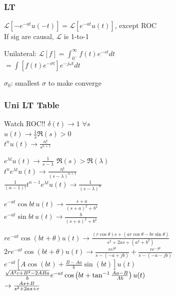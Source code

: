 \documentclass[4pt]{article}
\theoremstyle{definition}
\theoremstyle{definition}
\renewcommand{\o}{\omega}
\newcommand{\ra}{\rightarrow}
\newcommand{\ulint}{\int_{0^-}^{\infty}}    %
\begin{document}
\begin{landscape}
\begin{multicols}{3}
\subsubsection*{LT}
\(\mathcal L [-e^{-at}u(-t)] = \mathcal L [e^{-at} u(t)]\), except ROC\\
If sig are causal, $\mathcal L$ is 1-to-1           %

Unilateral: \(\mathcal{L}[f] = \ulint f(t) e^{-st} dt\)\\          %
\(= \int [f(t) e^{-\sigma t}] e^{-j\o t} dt\)


$\sigma_0$: smallest $\sigma$ to make converge
\subsubsection*{Uni LT Table}
    Watch ROC!!                                     %
    $\delta(t) \ra 1$ \hfill $\forall s$\\          %
    $u(t) \ra \frac{1}{s}$\hfill $\Re(s) > 0$\\
    $t^n u(t) \ra \frac{n!}{s^{n+1}}$               %

    \(e^{\lambda t} u(t) \ra \frac{1}{s-\lambda}\) \hfill $\Re(s) > \Re(\lambda)$\\        %
    \(t^n e^{\lambda t} u(t) \ra \frac{n!}{(s-\lambda)^{n+1}}\)\\     %
    \(\frac{1}{(n-1)!} t^{n-1} e^{\lambda t} u(t) \ra \frac{1}{(s-\lambda)^n} \)        %

    \(e^{-at} \cos bt\, u(t) \ra \frac{s+a}{(s+a)^2 + b^2}\)\\
    \(e^{-at} \sin bt\, u(t) \ra \frac{b}{(s+a)^2 + b^2}\)    

    \(re^{-at} \cos(bt + \theta) u(t) \ra \frac{(r\cos\theta)s + (ar \cos\theta - br\sin \theta)}{s^2 + 2as + (a^2 + b^2)}\)\\
    \(2re^{-at} \cos(bt + \theta) u(t) \ra \frac{re^{j\theta}}{s-(-a+jb)}+\frac{re^{-j\theta}}{s-(-a-jb)}\)\\
    \(e^{-at}\left[A\cos(b t) + \frac{B-Aa}{b}\sin(bt)\right] u(t)\)\\
    \(\hfill \frac{\sqrt{A^2c + B^2 - 2ABa}}{b}e^{-at}\cos\left(bt + \tan^{-1}\frac{Aa-B}{Ab}\right) u(t)\)\\
    \(\hfill \ra \frac{As+B}{s^2+2as+c}\)
\columnbreak

\end{multicols}
\end{landscape}
\end{document}
